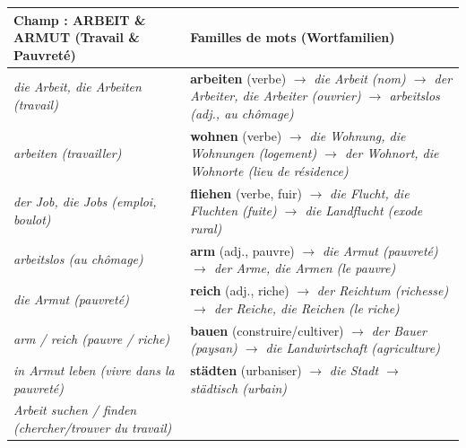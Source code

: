\documentclass[11pt]{article}
\newcommand{\all}[1]{\ifmmode\text{\textit{#1}}\else\begingroup\selectlanguage{ngerman}\itshape #1\endgroup\fi}
\begin{document}
\begin{center}
\begin{tabularx}{\linewidth}{|X|X|}
\hline
\rowcolor{popblueL}
\textbf{Champ : ARBEIT \& ARMUT (Travail \& Pauvreté)} & \textbf{Familles de mots (Wortfamilien)} \\
\hline
\all{die Arbeit, die Arbeiten} (travail) & \textbf{arbeiten} (verbe) $\rightarrow$ \all{die Arbeit} (nom) $\rightarrow$ \all{der Arbeiter, die Arbeiter} (ouvrier) $\rightarrow$ \all{arbeitslos} (adj., au chômage) \\
\all{arbeiten} (travailler) & \textbf{wohnen} (verbe) $\rightarrow$ \all{die Wohnung, die Wohnungen} (logement) $\rightarrow$ \all{der Wohnort, die Wohnorte} (lieu de résidence) \\
\all{der Job, die Jobs} (emploi, boulot) & \textbf{fliehen} (verbe, fuir) $\rightarrow$ \all{die Flucht, die Fluchten} (fuite) $\rightarrow$ \all{die Landflucht} (exode rural) \\
\all{arbeitslos} (au chômage) & \textbf{arm} (adj., pauvre) $\rightarrow$ \all{die Armut} (pauvreté) $\rightarrow$ \all{der Arme, die Armen} (le pauvre) \\
\all{die Armut} (pauvreté) & \textbf{reich} (adj., riche) $\rightarrow$ \all{der Reichtum} (richesse) $\rightarrow$ \all{der Reiche, die Reichen} (le riche) \\
\all{arm / reich} (pauvre / riche) & \textbf{bauen} (construire/cultiver) $\rightarrow$ \all{der Bauer} (paysan) $\rightarrow$ \all{die Landwirtschaft} (agriculture) \\
\all{in Armut leben} (vivre dans la pauvreté) & \textbf{städten} (urbaniser) $\rightarrow$ \all{die Stadt} $\rightarrow$ \all{städtisch} (urbain) \\
\all{Arbeit suchen / finden} (chercher/trouver du travail) & \\
\hline
\end{tabularx}
\end{center}
\end{document}
